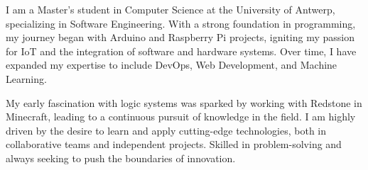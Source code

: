 

\begin{cvparagraph}

I am a Master's student in Computer Science at the University of Antwerp, specializing in Software Engineering. 
With a strong foundation in programming, my journey began with Arduino and Raspberry Pi projects, igniting my passion for IoT and the integration of software and hardware systems. 
Over time, I have expanded my expertise to include DevOps, Web Development, and Machine Learning.

My early fascination with logic systems was sparked by working with Redstone in Minecraft, leading to a continuous pursuit of knowledge in the field. 
I am highly driven by the desire to learn and apply cutting-edge technologies, both in collaborative teams and independent projects. 
Skilled in problem-solving and always seeking to push the boundaries of innovation.
\end{cvparagraph}
